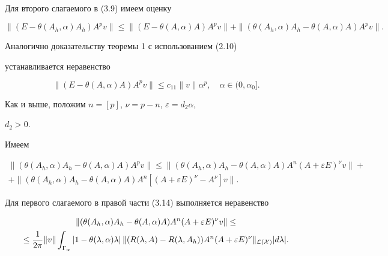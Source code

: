  


Для второго слагаемого в (3.9) имеем оценку 


\begin{equation} 


\|(E-\theta(A_h,\alpha)A_h)A^p v\|\le 


\|(E-\theta(A,\alpha)A)A^p v\|+ 


\|(\theta(A_h,\alpha)A_h-\theta(A,\alpha)A)A^p v\|. 


\end{equation} 


Аналогично доказательству теоремы 1 с использованием (2.10) 


устанавливается неравенство 


\begin{equation} 


\|(E-\theta(A,\alpha)A)A^p v\|\le c_{11} 


\|v\|\alpha^p,\quad \alpha\in(0,\alpha_0]. 


\end{equation} 


Как и выше, положим $n=[p]$, $\nu=p-n$, $\varepsilon=d_2\alpha$, 


$d_2>0$. 


Имеем 


\begin{multline} 


\|(\theta(A_h,\alpha)A_h-\theta(A,\alpha)A)A^p v\|\le 


\|(\theta(A_h,\alpha)A_h-\theta(A,\alpha)A)A^n 


(A+\varepsilon E)^\nu v\|+ \\ 


% 


+\|(\theta(A_h,\alpha)A_h-\theta(A,\alpha)A)A^n 


[(A+\varepsilon E)^\nu-A^\nu]v\|. 


\end{multline} 


Для первого слагаемого в правой части (3.14) выполняется неравенство 


\begin{multline*} 


\|(\theta(A_h,\alpha)A_h-\theta(A,\alpha)A)A^n 


(A+\varepsilon E)^\nu v\|\le \\ 


% 


\le\frac{1}{2\pi}\|v\|\int_{\Gamma_\alpha} 


|1-\theta(\lambda,\alpha)\lambda|\,\|(R(\lambda,A)- 


R(\lambda,A_h))A^n(A+\varepsilon E)^\nu 


\|_{\cal L(X)}|d\lambda|. 


\end{multline*} 


